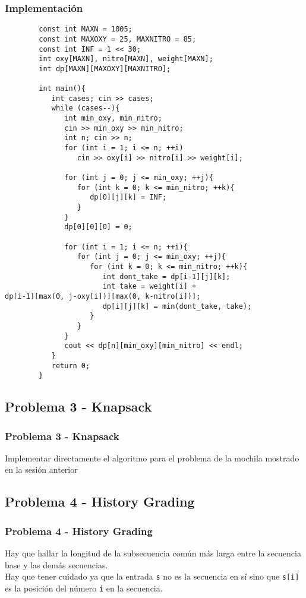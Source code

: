 \documentclass{beamer}
\begin{document}
	\begin{frame}
		\frametitle{Implementación}
		\begin{lstlisting}
		const int MAXN = 1005;
		const int MAXOXY = 25, MAXNITRO = 85;
		const int INF = 1 << 30;
		int oxy[MAXN], nitro[MAXN], weight[MAXN];
		int dp[MAXN][MAXOXY][MAXNITRO];

		int main(){
		   int cases; cin >> cases;
		   while (cases--){
		      int min_oxy, min_nitro;
		      cin >> min_oxy >> min_nitro;
		      int n; cin >> n;
		      for (int i = 1; i <= n; ++i)
		         cin >> oxy[i] >> nitro[i] >> weight[i];

		      for (int j = 0; j <= min_oxy; ++j){
		         for (int k = 0; k <= min_nitro; ++k){
		            dp[0][j][k] = INF;
		         }
		      }
		      dp[0][0][0] = 0;

		      for (int i = 1; i <= n; ++i){
		         for (int j = 0; j <= min_oxy; ++j){
		            for (int k = 0; k <= min_nitro; ++k){
		               int dont_take = dp[i-1][j][k];
		               int take = weight[i] +                               dp[i-1][max(0, j-oxy[i])][max(0, k-nitro[i])];
		               dp[i][j][k] = min(dont_take, take);
		            }
		         }
		      }
		      cout << dp[n][min_oxy][min_nitro] << endl;
		   }
		   return 0;
		}
		\end{lstlisting}
	\end{frame}
	
	\subsection{Problema 3 - Knapsack}
	\begin{frame}
		\frametitle{Problema 3 - Knapsack}
		Implementar directamente el algoritmo para el problema de la mochila mostrado en la sesión anterior
	\end{frame}
	
	\subsection{Problema 4 - History Grading}
	\begin{frame}[fragile]
		\frametitle{Problema 4 - History Grading}
		Hay que hallar la longitud de la subsecuencia común más larga entre la secuencia base y las demás secuencias.\\
		Hay que tener cuidado ya que la entrada \verb|s| no es la secuencia en sí sino que \verb|s[i]| es la posición del número \verb|i| en la secuencia.
	\end{frame}
	
\end{document}
